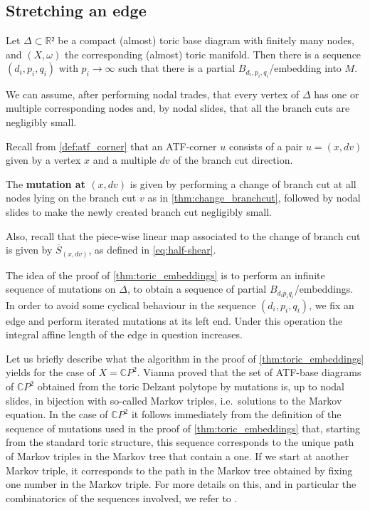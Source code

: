 \documentclass[12pt,a4paper,abstract=true,final]{scrartcl}
\begin{document}
\subsection{Stretching an edge}
\label{sec:stretch_edge}

\begin{proposition}
  \label{thm:toric_embeddings}
  Let $Δ ⊂ ℝ²$ be a compact (almost) toric base diagram with finitely many nodes, and $(X,ω)$ the corresponding (almost) toric manifold.
  Then there is a sequence $(d_i,p_i,q_i)$ with $p_i → ∞$ such that there is a partial $B_{d_i,p_i,q_i}$\-/embedding into $M$.
\end{proposition}

We can assume, after performing nodal trades, that every vertex of $Δ$ has one or multiple corresponding nodes and, by nodal slides, that all the branch cuts are negligibly small.

Recall from \cref{def:atf_corner} that an ATF-corner $u$ consists of a pair $u=(x,dv)$ given by a vertex $x$ and a multiple $dv$ of the branch cut direction.

\begin{definition}
  \label{def:mutation_at_atf_corner}
  The \textbf{mutation at $(x,dv)$} is given by performing a change of branch cut at all nodes lying on the branch cut $v$ as in \cref{thm:change_branchcut}, followed by nodal slides to make the newly created branch cut negligibly small.
\end{definition}

Also, recall that the piece-wise linear map associated to the change of branch cut is given by $\overline{S}_{(x,dv)}$, as defined in \eqref{eq:half-shear}.

The idea of the proof of \cref{thm:toric_embeddings} is to perform an infinite sequence of mutations on $Δ$, to obtain a sequence of partial $B_{d_i p_i q_i}$\-/embeddings.
In order to avoid some cyclical behaviour in the sequence $(d_i,p_i,q_i)$, we fix an edge and perform iterated mutations at its left end.
Under this operation the integral affine length of the edge in question increases.

\begin{remark}
  Let us briefly describe what the algorithm in the proof of \cref{thm:toric_embeddings} yields for the case of $X = \mathbb{C}P^2$.
  Vianna \cite{Via16} proved that the set of ATF-base diagrams of $\mathbb{C}P^2$ obtained from the toric Delzant polytope by mutations is, up to nodal slides, in bijection with so-called Markov triples, i.e.\ solutions to the Markov equation.
  In the case of $\mathbb{C}P^2$ it follows immediately from the definition of the sequence of mutations used in the proof of \cref{thm:toric_embeddings} that, starting from the standard toric structure, this sequence corresponds to the unique path of Markov triples in the Markov tree that contain a one.
  If we start at another Markov triple, it corresponds to the path in the Markov tree obtained by fixing one number in the Markov triple.
For more details on this, and in particular the combinatorics of the sequences involved, we refer to \cite[Section~8.4, Appendix~I]{evans2021atfs}.
\end{remark}
\end{document}
